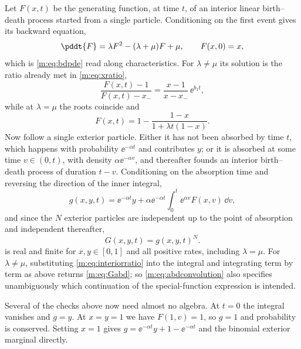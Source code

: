 Let $F(x,t)$ be the generating function, at time $t$, of an interior linear
birth--death process started from a single particle. Conditioning on the first
event gives its backward equation,
\begin{equation}
\label{m:eq:interiorbackward}
\pddt{F} = \lambda F^2 - (\lambda+\mu)F + \mu,
\qquad F(x,0) = x ,
\end{equation}
which is \cref{m:eq:bdpde} read along characteristics. For $\lambda\neq\mu$ its
solution is the ratio already met in \cref{m:eq:xratio},
\begin{equation}
\label{m:eq:interiorratio}
\frac{F(x,t)-1}{F(x,t)-x_-} = \frac{x-1}{x-x_-}\,\ee^{b_1 t},
\end{equation}
while at $\lambda=\mu$ the roots coincide and
\begin{equation}
\label{m:eq:interiorcritical}
F(x,t) = 1-\frac{1-x}{1+\lambda t(1-x)} .
\end{equation}
Now follow a single exterior particle. Either it has not been absorbed by time $t$,
which happens with probability $\ee^{-\alpha t}$ and contributes $y$; or it is
absorbed at some time $v\in(0,t)$, with density $\alpha\ee^{-\alpha v}$, and
thereafter founds an interior birth--death process of duration $t-v$. Conditioning
on the absorption time and reversing the direction of the inner integral,
\begin{equation}
\label{m:eq:abdconvolution}
g(x,y,t) = \ee^{-\alpha t}y
+ \alpha\ee^{-\alpha t}\int_0^t\ee^{\alpha v}F(x,v)\,\dd v ,
\end{equation}
and since the $N$ exterior particles are independent up to the point of absorption
and independent thereafter,
\begin{equation}
\label{m:eq:abdconvpower}
G(x,y,t) = g(x,y,t)^N .
\end{equation}
 is real and finite for $x,y\in[0,1]$ and all positive
rates, including $\lambda=\mu$. For $\lambda\neq\mu$, substituting
\cref{m:eq:interiorratio} into the integral and integrating term by term as above
returns \cref{m:eq:Gabd}; so \cref{m:eq:abdconvolution} also specifies unambiguously
which continuation of the special-function expression is intended.

Several of the checks above now need almost no algebra. At $t=0$ the integral
vanishes and $g=y$. At $x=y=1$ we have $F(1,v)=1$, so $g=1$ and probability is
conserved. Setting $x=1$ gives $g = \ee^{-\alpha t}y+1-\ee^{-\alpha t}$ and the
binomial exterior marginal directly.

